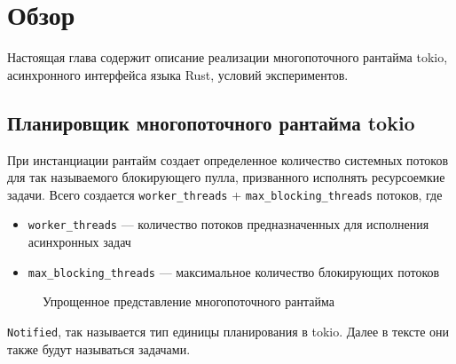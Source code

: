 
\section{Обзор}

Настоящая глава содержит описание реализации многопоточного рантайма tokio, асинхронного интерфейса языка Rust, условий экспериментов.

\subsection{Планировщик многопоточного рантайма tokio}

При инстанциации рантайм создает определенное количество системных потоков для так называемого блокирующего пулла, призванного исполнять ресурсоемкие задачи. Всего создается \verb|worker_threads| + \verb|max_blocking_threads| потоков, где

\begin{itemize}
    \item \verb|worker_threads| --- количество потоков предназначенных для исполнения асинхронных задач
    \item \verb|max_blocking_threads| --- максимальное количество блокирующих потоков
\end{itemize}

\begin{figure}[H]
    \begin{center}
    \end{center}

    \caption{Упрощенное представление многопоточного рантайма}
    \label{fig:tokio:arch}
\end{figure}

\verb|Notified|, так называется тип единицы планирования в tokio. Далее в тексте они также будут называться задачами.

